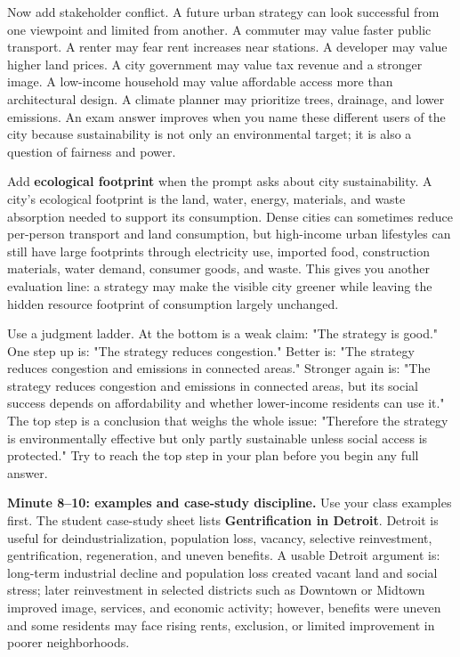 \documentclass[11pt,a4paper]{article}
\newcommand{\term}[1]{\textcolor{HeadingBlue}{\textbf{#1}}}
\begin{document}
Now add stakeholder conflict. A future urban strategy can look successful from
one viewpoint and limited from another. A commuter may value faster public
transport. A renter may fear rent increases near stations. A developer may
value higher land prices. A city government may value tax revenue and a stronger
image. A low-income household may value affordable access more than
architectural design. A climate planner may prioritize trees, drainage, and
lower emissions. An exam answer improves when you name these different users of
the city because sustainability is not only an environmental target; it is also
a question of fairness and power.

Add \term{ecological footprint} when the prompt asks about city sustainability.
A city's ecological footprint is the land, water, energy, materials, and waste
absorption needed to support its consumption. Dense cities can sometimes reduce
per-person transport and land consumption, but high-income urban lifestyles can
still have large footprints through electricity use, imported food, construction
materials, water demand, consumer goods, and waste. This gives you another
evaluation line: a strategy may make the visible city greener while leaving the
hidden resource footprint of consumption largely unchanged.

Use a judgment ladder. At the bottom is a weak claim: "The strategy is good."
One step up is: "The strategy reduces congestion." Better is: "The strategy
reduces congestion and emissions in connected areas." Stronger again is:
"The strategy reduces congestion and emissions in connected areas, but its
social success depends on affordability and whether lower-income residents can
use it." The top step is a conclusion that weighs the whole issue:
"Therefore the strategy is environmentally effective but only partly
sustainable unless social access is protected." Try to reach the top step in
your plan before you begin any full answer.

\textbf{Minute 8--10: examples and case-study discipline.}
Use your class examples first. The student case-study sheet lists
\term{Gentrification in Detroit}. Detroit is useful for deindustrialization,
population loss, vacancy, selective reinvestment, gentrification, regeneration,
and uneven benefits. A usable Detroit argument is: long-term industrial decline
and population loss created vacant land and social stress; later reinvestment
in selected districts such as Downtown or Midtown improved image, services, and
economic activity; however, benefits were uneven and some residents may face
rising rents, exclusion, or limited improvement in poorer neighborhoods.
\end{document}
